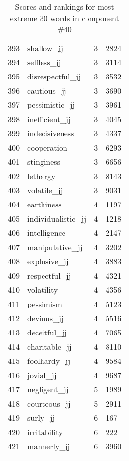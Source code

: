 \begin{longtable}[!htbp]{| rlr@{.}l |}
    393 & shallow\_jj & 3 & 2824 \\
    394 & selfless\_jj & 3 & 3114 \\
    395 & disrespectful\_jj & 3 & 3532 \\
    396 & cautious\_jj & 3 & 3690 \\
    397 & pessimistic\_jj & 3 & 3961 \\
    398 & inefficient\_jj & 3 & 4045 \\
    399 & indecisiveness & 3 & 4337 \\
    400 & cooperation & 3 & 6293 \\
    401 & stinginess & 3 & 6656 \\
    402 & lethargy & 3 & 8143 \\
    403 & volatile\_jj & 3 & 9031 \\
    404 & earthiness & 4 & 1197 \\
    405 & individualistic\_jj & 4 & 1218 \\
    406 & intelligence & 4 & 2147 \\
    407 & manipulative\_jj & 4 & 3202 \\
    408 & explosive\_jj & 4 & 3883 \\
    409 & respectful\_jj & 4 & 4321 \\
    410 & volatility & 4 & 4356 \\
    411 & pessimism & 4 & 5123 \\
    412 & devious\_jj & 4 & 5516 \\
    413 & deceitful\_jj & 4 & 7065 \\
    414 & charitable\_jj & 4 & 8110 \\
    415 & foolhardy\_jj & 4 & 9584 \\
    416 & jovial\_jj & 4 & 9687 \\
    417 & negligent\_jj & 5 & 1989 \\
    418 & courteous\_jj & 5 & 2911 \\
    419 & surly\_jj & 6 & 167 \\
    420 & irritability & 6 & 222 \\
    421 & mannerly\_jj & 6 & 3960 \\
    \hline
    \caption{Scores and rankings for most extreme 30 words in component \#40} \\
\end{longtable}
